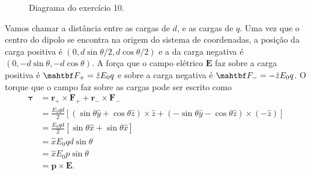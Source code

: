 \documentclass[11pt]{article}
\begin{document}
\begin{figure}[h!]
  \centering
  \caption{Diagrama do exercício 10.}
  \label{fig:ex-10}
\end{figure}
Vamos chamar a distância entre as cargas de \(d\), e as cargas de \(q\). Uma
vez que o centro do dipolo se encontra na origem do sistema de
coordenadas, a posição da carga positiva é
\((0,d\sin\theta/2,d\cos\theta/2)\) e a da carga negativa é
\((0,-d\sin\theta,-d\cos\theta)\). A força que o campo elétrico \(\mathbf
E\) faz sobre a carga positiva é \(\mahtbf F_+ = \hat z E_0 q\) e sobre a
carga negativa é \(\mahtbf F_- = -\hat z E_0 q\). O torque que o campo faz
sobre as cargas pode ser escrito como
\begin{align}
  \boldsymbol \tau &= \mathbf{r}_+\times\mathbf{F}_++\mathbf{r}_-\times\mathbf{F}_-\\
                &= \frac{E_0qd}{2}[(\sin\theta\hat y+\cos\theta\hat z)\times\hat z +
                  (-\sin\theta\hat y-\cos\theta\hat z)\times(-\hat z)]\\
                &= \frac{E_0qd}{2}[\sin\theta\hat x +
                  \sin\theta\hat x]\\
                &= \hat x E_0 qd \sin\theta\\
                &= \hat x E_0 p \sin\theta\\
                &= \mathbf p\times\mathbf E.
\end{align}
\end{document}
